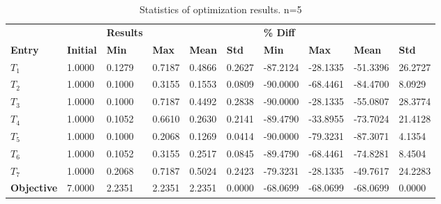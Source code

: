 \begin{table}[H]
\centering
\begin{tabular}{llllllllll}
\textbf{} & \textbf{} & \cellcolor[HTML]{EFEFEF}\textbf{Results} & \cellcolor[HTML]{EFEFEF} & \cellcolor[HTML]{EFEFEF} & \cellcolor[HTML]{EFEFEF} & \cellcolor[HTML]{EFEFEF}\textbf{\% Diff} & \cellcolor[HTML]{EFEFEF} & \cellcolor[HTML]{EFEFEF} & \cellcolor[HTML]{EFEFEF} \\
\rowcolor[HTML]{EFEFEF} 
\textbf{Entry} & \textbf{Initial} & \textbf{Min} & \textbf{Max} & \textbf{Mean} & \textbf{Std} & \textbf{Min} & \textbf{Max} & \textbf{Mean} & \textbf{Std} \\
$T_1$ & 1.0000 & 0.1279 & 0.7187 & 0.4866 & 0.2627 & -87.2124 & -28.1335 & -51.3396 & 26.2727 \\ 
$T_2$ & 1.0000 & 0.1000 & 0.3155 & 0.1553 & 0.0809 & -90.0000 & -68.4461 & -84.4700 & 8.0929 \\ 
$T_3$ & 1.0000 & 0.1000 & 0.7187 & 0.4492 & 0.2838 & -90.0000 & -28.1335 & -55.0807 & 28.3774 \\ 
$T_4$ & 1.0000 & 0.1052 & 0.6610 & 0.2630 & 0.2141 & -89.4790 & -33.8955 & -73.7024 & 21.4128 \\ 
$T_5$ & 1.0000 & 0.1000 & 0.2068 & 0.1269 & 0.0414 & -90.0000 & -79.3231 & -87.3071 & 4.1354 \\ 
$T_6$ & 1.0000 & 0.1052 & 0.3155 & 0.2517 & 0.0845 & -89.4790 & -68.4461 & -74.8281 & 8.4504 \\ 
$T_7$ & 1.0000 & 0.2068 & 0.7187 & 0.5024 & 0.2423 & -79.3231 & -28.1335 & -49.7617 & 24.2283 \\ 
\rowcolor[HTML]{EFEFEF} 
\textbf{Objective} & 7.0000 & 2.2351 & 2.2351 & 2.2351 & 0.0000 & -68.0699 & -68.0699 & -68.0699 & 0.0000 \\ 
\end{tabular}
\caption{Statistics of optimization results. n=5}
\label{tab:StatisticsOptimizationAnalysis}
\end{table}